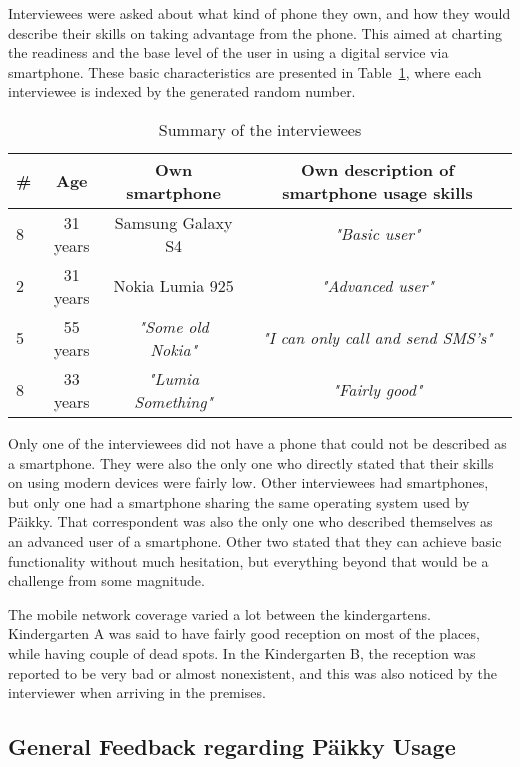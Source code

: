 Interviewees were asked about what kind of phone they own, and how they would describe their skills on taking advantage from the phone. This aimed at charting the readiness and the base level of the user in using a digital service via smartphone. These basic characteristics are presented in Table~\ref{table:intervieweeSummary}, where each interviewee is indexed by the generated random number.

\begin{table}[h]
\caption{Summary of the interviewees}
\label{table:intervieweeSummary}
\centering
\begin{tabular}{ l || c | c | c }
	\hline
	\textbf{\#} & \textbf{Age} & \textbf{Own smartphone} & \textbf{Own description of smartphone usage skills} \\ \hline \hline
	8 & 31 years & Samsung Galaxy S4 & \textit{"Basic user"} \\ \hline %
	2 & 31 years & Nokia Lumia 925 & \textit{"Advanced user"} \\ \hline
	5 & 55 years & \textit{"Some old Nokia"} & \textit{"I can only call and send SMS's"} \\ \hline
	8 & 33 years & \textit{"Lumia Something"} & \textit{"Fairly good"} \\
	\hline
\end{tabular}
\end{table}

Only one of the interviewees did not have a phone that could not be described as a smartphone. They were also the only one who directly stated that their skills on using modern devices were fairly low. Other interviewees had smartphones, but only one had a smartphone sharing the same operating system used by Päikky. That correspondent was also the only one who described themselves as an advanced user of a smartphone. Other two stated that they can achieve basic functionality without much hesitation, but everything beyond that would be a challenge from some magnitude. 

The mobile network coverage varied a lot between the kindergartens. Kindergarten A was said to  have fairly good reception on most of the places, while having couple of dead spots. In the Kindergarten B, the reception was reported to be very bad or almost nonexistent, and this was also noticed by the interviewer when arriving in the premises. 



\subsection{General Feedback regarding Päikky Usage}


